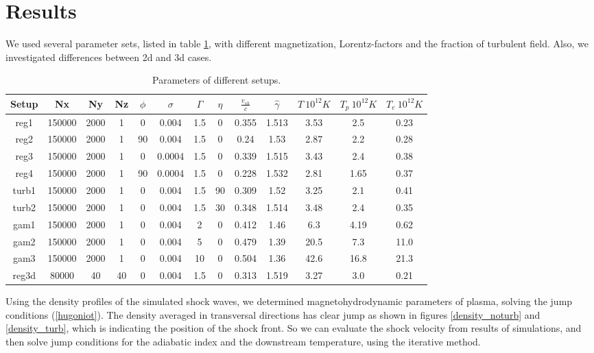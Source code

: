 \documentclass[a4paper]{jpconf}
\begin{document}
	\section{Results}
	We used several parameter sets, listed in table \ref{setups}, with different magnetization, Lorentz-factors and the fraction of turbulent field. Also, we investigated differences between 2d and 3d cases.
	\begin{table}[h!]
		\label{setups}
		\begin{center}
			\begin{tabular}{|c | c| c | c| c| c| c| c| c| c| c| c| c|}
				\hline
				Setup & Nx & Ny & Nz & $\phi$ & $\sigma$ & $\Gamma$ & $\eta$ & $\frac{v_{sh}}{c}$ & $\hat{\gamma}$ & $T \ 10^{12} K$ & $T_p\ 10^{12}K$ & $T_e \ 10^{12}K$\\
				\hline
				reg1 & 150000 & 2000 & 1 & 0 & 0.004 & 1.5 & 0 & 0.355 & 1.513 & 3.53 & 2.5 & 0.23\\
				reg2 & 150000 & 2000 & 1 & 90 & 0.004 & 1.5 & 0 & 0.24 & 1.53 & 2.87 & 2.2 & 0.28\\
				reg3 & 150000 & 2000 & 1 & 0 & 0.0004 & 1.5 & 0 & 0.339 & 1.515 & 3.43 &2.4 & 0.38\\
				reg4 & 150000 & 2000 & 1 & 90 & 0.0004 & 1.5 & 0 & 0.228 & 1.532 & 2.81 &1.65 & 0.37\\
				turb1 & 150000 & 2000 & 1 & 0 & 0.004 & 1.5 & 90 & 0.309 & 1.52 & 3.25 & 2.1 & 0.41\\
				turb2 & 150000 & 2000 & 1 & 0 & 0.004 & 1.5 & 30 & 0.348 & 1.514 & 3.48 & 2.4 & 0.35\\
				gam1 & 150000 & 2000 & 1 & 0 & 0.004 & 2 & 0 & 0.412 & 1.46 & 6.3 & 4.19 & 0.62\\
				gam2 & 150000 & 2000 & 1 & 0 & 0.004 & 5 & 0 & 0.479 & 1.39 & 20.5 & 7.3 & 11.0\\
				gam3 & 150000 & 2000 & 1 & 0 & 0.004 & 10 & 0 & 0.504 & 1.36 & 42.6 & 16.8 & 21.3\\
				reg3d & 80000 & 40 & 40 & 0 & 0.004 & 1.5 & 0 & 0.313 & 1.519 & 3.27 & 3.0 & 0.21\\
				
				\hline
			\end{tabular}
		\end{center}
		\caption{Parameters of different setups. }
	\end{table}
	
	Using the density profiles of the simulated shock waves, we determined magnetohydrodynamic parameters of plasma, solving the jump conditions (\ref{hugoniot}). The density averaged in transversal directions has clear jump as shown in figures \ref{density_noturb} and \ref{density_turb}, which is indicating the position of the shock front. So we can evaluate the shock velocity from results of simulations, and then solve jump conditions for the adiabatic index and the downstream temperature, using the iterative method. 
	
\end{document}
